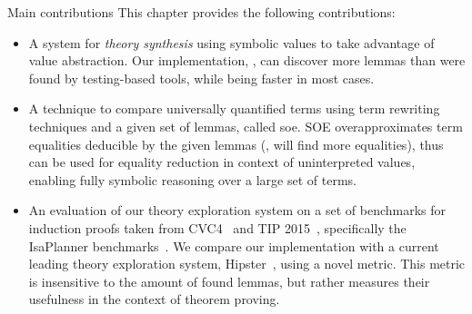 \medskip
\begin{myparagraph}{Main contributions}
This chapter provides the following contributions:
\begin{itemize}[topsep=2pt, leftmargin=1.5em]
    \item A system for \emph{theory synthesis} using symbolic values to take advantage of value abstraction.
    Our implementation, \TheSy, can discover more lemmas than were found by testing-based tools, while being faster in most cases.
    \item A technique to compare universally quantified terms using term rewriting techniques and a given set of lemmas, called \gls{soe}. 
    SOE overapproximates term equalities deducible by the given lemmas (\ie, will find more equalities), thus can be used for equality reduction in context of uninterpreted values, enabling fully symbolic reasoning over a large set of terms.
    \item An evaluation of our theory exploration system on a set of benchmarks for induction proofs taken from CVC4~\cite{cvc4induction} and TIP 2015~\cite{CICM2015:Claessen}, specifically the IsaPlanner benchmarks~\cite{ITP2010:Johansson}.
    We compare our implementation with a current leading theory exploration system, Hipster~\cite{2018AISC:Einarsdottir}, using a novel metric. This metric is insensitive to the amount of found lemmas, but rather measures their usefulness in the context of theorem proving.
\end{itemize}
\end{myparagraph}